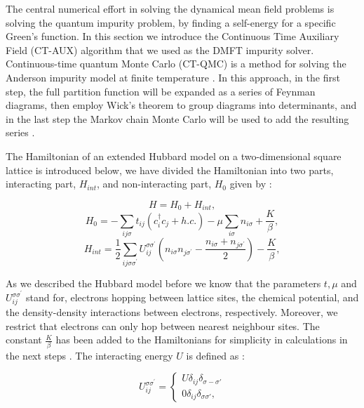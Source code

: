 The central numerical effort in solving the dynamical mean field problems is solving the quantum impurity problem, by finding a self-energy for a specific Green's function. In this section we introduce the Continuous Time Auxiliary Field (CT-AUX) algorithm that we used as the DMFT impurity solver. Continuous-time quantum Monte Carlo (CT-QMC) is a method for solving the Anderson impurity model at finite temperature \cite{Hanna, werner, Joseph, staar}. In this approach, in the first step, the full partition function will be expanded as a series of Feynman diagrams, then employ Wick's theorem to group diagrams into determinants, and in the last step the Markov chain Monte Carlo will be used to add the resulting series \cite{werner}. 

The Hamiltonian of an extended Hubbard model on a two-dimensional square lattice is introduced below, we have divided the Hamiltonian into two parts,
interacting part, $H_{int}$, and non-interacting part, $H_0$ given by
 \cite{Hanna}:

\begin{equation}
    H=H_0+H_{int},
\end{equation}
\begin{equation}
    H_0=-\sum _{ij\sigma}t_{ij}(c_i ^ \dagger c_j + h.c.) -\mu \sum _{i\sigma} n_{i\sigma}+ \frac{K}{\beta},
\end{equation}
\begin{equation}
    H_{int}=\frac{1}{2} \sum _{ij\sigma \sigma^ \prime} U_{ij}^{\sigma \sigma^ \prime} (n_{i \sigma}n_{j\sigma^\prime} - \frac {n_{i \sigma}+n_{j\sigma^\prime}}{2}) - \frac{K}{\beta},
\end{equation}

As we described the Hubbard model before we know that the parameters $t, \mu$ and $U_{ij}^{\sigma \sigma^ \prime} $ stand for, electrons hopping between lattice sites, the chemical potential, and the density-density interactions between electrons, respectively. Moreover, we restrict that  electrons can only hop between nearest neighbour sites. The constant $\frac{K}{\beta}$ has been added to the Hamiltonians for simplicity in calculations in the next steps \cite{werner}. The interacting energy $U$ is defined as \cite{Hanna}:

\begin{equation}
   U_{ij}^{\sigma \sigma^ \prime}= \begin{cases} 
   U\delta_{ij} \delta _{\sigma - \sigma '}\\
   0 \delta_{ij} \delta _{\sigma \sigma '},
   \end{cases}
   \label{eq:U}
\end{equation}

